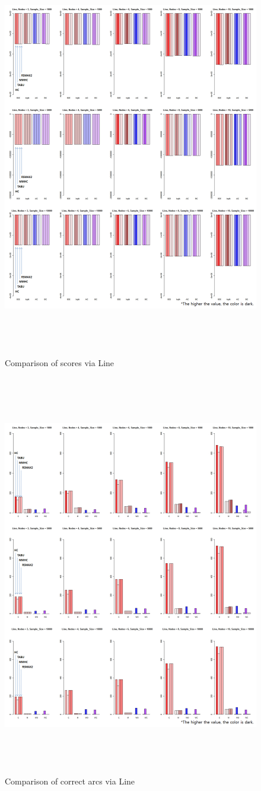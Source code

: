 	\begin{figure}[p]
	\centering
		\includegraphics[height=500pt]{02_Line_Score}
		\caption{Comparison of scores via Line}
	\end{figure}	

	\begin{figure}[p]
	\centering
		\includegraphics[height=500pt]{02_Line_Arcs}
		\caption{Comparison of correct arcs via Line}
	\end{figure}	
